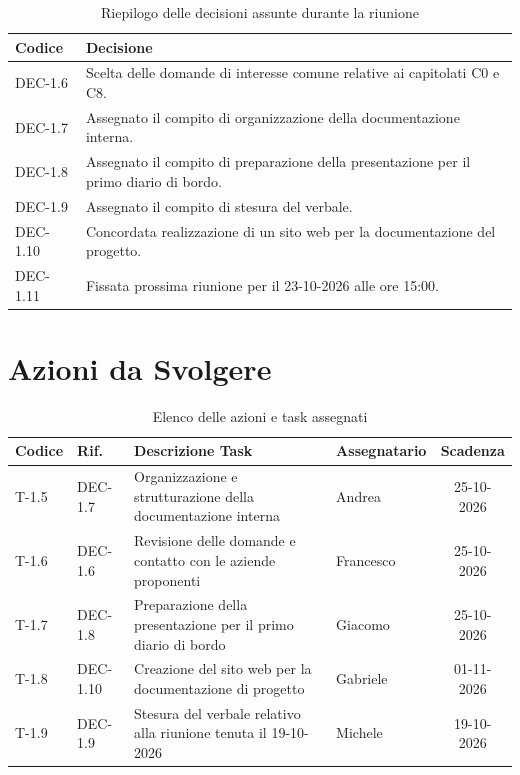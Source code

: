 \documentclass[11pt, a4paper]{article}
\begin{document}
\begin{table}[htbp]
\centering
\caption{Riepilogo delle decisioni assunte durante la riunione}
\label{tab:decisioni}
\begin{tabularx}{\textwidth}{l X}
\toprule
\textbf{Codice} & \textbf{Decisione} \\
\midrule
DEC-1.6 & Scelta delle domande di interesse comune relative ai capitolati C0 e C8. \\
DEC-1.7 & Assegnato il compito di organizzazione della documentazione interna. \\
DEC-1.8 & Assegnato il compito di preparazione della presentazione per il primo diario di bordo. \\
DEC-1.9 & Assegnato il compito di stesura del verbale. \\
DEC-1.10 & Concordata realizzazione di un sito web per la documentazione del progetto. \\
DEC-1.11 & Fissata prossima riunione per il 23-10-2026 alle ore 15:00. \\
\bottomrule
\end{tabularx}
\end{table}

\section{Azioni da Svolgere}

\begin{table}[htbp]
\centering
\caption{Elenco delle azioni e task assegnati}
\label{tab:azioni}
\begin{tabularx}{\textwidth}{l l X l c}
\toprule
\textbf{Codice} & \textbf{Rif.} & \textbf{Descrizione Task} & \textbf{Assegnatario} & \textbf{Scadenza} \\
\midrule
T-1.5 & DEC-1.7 & Organizzazione e strutturazione della documentazione interna & Andrea & 25-10-2026 \\
T-1.6 & DEC-1.6 & Revisione delle domande e contatto con le aziende proponenti & Francesco & 25-10-2026 \\
T-1.7 & DEC-1.8 & Preparazione della presentazione per il primo diario di bordo & Giacomo & 25-10-2026 \\
T-1.8 & DEC-1.10 & Creazione del sito web per la documentazione di progetto & Gabriele & 01-11-2026 \\
T-1.9 & DEC-1.9 & Stesura del verbale relativo alla riunione tenuta il 19-10-2026 & Michele & 19-10-2026 \\
\bottomrule
\end{tabularx}
\end{table}
\end{document}
